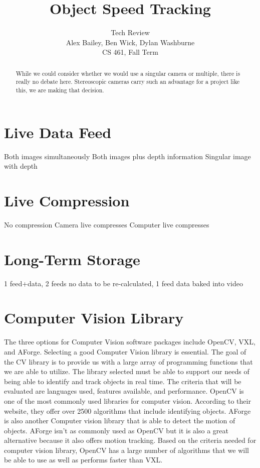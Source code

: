 \documentclass[letterpaper,10pt,onecolumn,draftclsnofoot]{IEEEtran}
\title{Object Speed Tracking}
\author{Tech Review\\Alex Bailey, Ben Wick, Dylan Washburne\\CS 461, Fall Term}
\begin{document}
\begin{titlepage}

\maketitle

\begin{abstract}
While we could consider whether we would use a singular camera or multiple, there is really no debate here.
Stereoscopic cameras carry such an advantage for a project like this, we are making that decision.
 
\end{abstract}

\end{titlepage}

\tableofcontents
\newpage

\section{Live Data Feed} %

Both images simultaneously
Both images plus depth information
Singular image with depth

\section{Live Compression} %

No compression
Camera live compresses
Computer live compresses

\section{Long-Term Storage}%

1 feed+data, 
2 feeds no data to be re-calculated, 
1 feed data baked into video

\section{Computer Vision Library} %

The three options for Computer Vision software packages include OpenCV, VXL, and AForge.
Selecting a good Computer Vision library is essential. The goal of the CV library is to provide us with a large array of programming functions that we are able to utilize.
The library selected must be able to support our needs of being able to identify and track objects in real time.
The criteria that will be evaluated are languages used, features available, and performance.
OpenCV is one of the most commonly used libraries for computer vision.
According to their website, they offer over 2500 algorithms that include identifying objects.
AForge is also another Computer vision library that is able to detect the motion of objects.
AForge isn't as commonly used as OpenCV but it is also a great alternative because it also offers motion tracking.
Based on the criteria needed for computer vision library, OpenCV has a large number of algorithms that we will be able to use as well as performs faster than VXL.
\end{document}
